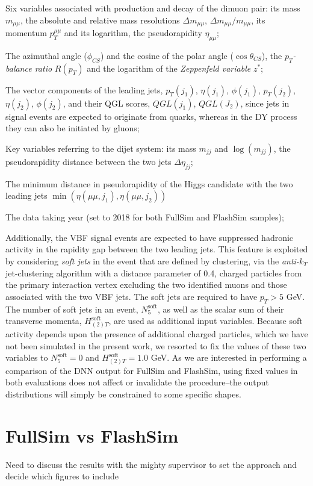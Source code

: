 \begin{outline}
\1 Six variables associated with production and decay of the dimuon pair: its mass $m_{\mu\mu}$, the absolute and relative mass resolutions $\Delta m_{\mu\mu}$, $\Delta m_{\mu\mu}/m_{\mu\mu}$, its momentum $p_T^{\mu\mu}$ and its logarithm, the pseudorapidity $\eta_{\mu\mu}$;

\1 The azimuthal angle ($\phi_{CS}$) and the cosine of the polar angle ($\cos\theta_{CS}$), the $p_T$\emph{-balance ratio} $R(p_T)$ and the logarithm of the \emph{Zeppenfeld variable} $z^*$;

\1 The vector components of the leading jets, $p_T(j_1)$, $\eta(j_1)$, $\phi(j_1)$, $p_T(j_2)$, $\eta(j_2)$, $\phi(j_2)$, and their QGL scores, $QGL(j_1)$, $QGL(J_2)$, since jets in signal events are expected to originate from quarks, whereas in the DY process they can also be initiated by gluons;

\1 Key variables referring to the dijet system: its mass $m_{jj}$ and $\log(m_{jj})$, the pseudorapidity distance between the two jets $\Delta \eta_{jj}$;

\1  The minimum distance in pseudorapidity of the Higgs candidate with the two leading jets $\min(\eta(\mu\mu, j_1),\eta(\mu\mu, j_2))$

\1 The data taking year (set to 2018 for both FullSim and FlashSim samples);
\end{outline}

Additionally, the VBF signal events are expected to have suppressed hadronic activity in the rapidity gap between the two leading jets. This feature is exploited by considering \emph{soft jets} in the event that are defined by clustering, via the \emph{anti-}$k_T$ jet-clustering algorithm with a distance parameter of 0.4, charged particles from the primary interaction vertex excluding the two identified muons and those associated with the two VBF jets. The soft jets are required to have $p_T>5$ GeV. The number of soft jets in an event, $N^{\text{soft}}_5$, as well as the scalar sum of their transverse momenta, $H^{\text{soft}}_{(2)T}$, are used as additional input variables. 
Because soft activity depends upon the presence of additional charged particles, which we have not been simulated in the present work, we resorted to fix the values of these two variables to $N^{\text{soft}}_5=0$ and $H^{\text{soft}}_{(2)T}=1.0$ GeV. As we are interested in performing a comparison of the DNN output for FullSim and FlashSim, using fixed values in both evaluations does not affect or invalidate the procedure--the output distributions will simply be constrained to some specific shapes.

\section{FullSim vs FlashSim}

Need to discuss the results with the mighty supervisor to set the approach and decide which figures to include